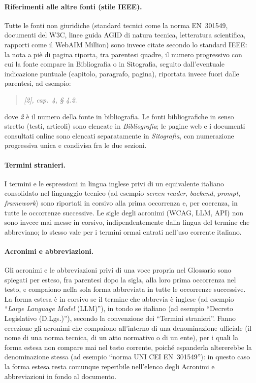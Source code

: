 \paragraph*{Riferimenti alle altre fonti (stile IEEE).} Tutte le fonti non giuridiche (standard tecnici come la norma EN~301549, documenti del W3C, linee guida AGID di natura tecnica, letteratura scientifica, rapporti come il WebAIM Million) sono invece citate secondo lo standard IEEE: la nota a piè di pagina riporta, tra parentesi quadre, il numero progressivo con cui la fonte compare in Bibliografia o in Sitografia, seguito dall'eventuale indicazione puntuale (capitolo, paragrafo, pagina), riportata invece fuori dalle parentesi, ad esempio:
\begin{quote}
\itshape [2], cap.~4, § 4.2.
\end{quote}
dove \emph{2} è il numero della fonte in bibliografia. Le fonti bibliografiche in senso stretto (testi, articoli) sono elencate in \emph{Bibliografia}; le pagine web e i documenti consultati online sono elencati separatamente in \emph{Sitografia}, con numerazione progressiva unica e condivisa fra le due sezioni.

\paragraph*{Termini stranieri.} I termini e le espressioni in lingua inglese privi di un equivalente italiano consolidato nel linguaggio tecnico (ad esempio \emph{screen reader}, \emph{backend}, \emph{prompt}, \emph{framework}) sono riportati in corsivo alla prima occorrenza e, per coerenza, in tutte le occorrenze successive. Le sigle degli acronimi (WCAG, LLM, API) non sono invece mai messe in corsivo, indipendentemente dalla lingua del termine che abbreviano; lo stesso vale per i termini ormai entrati nell'uso corrente italiano.

\paragraph*{Acronimi e abbreviazioni.} Gli acronimi e le abbreviazioni privi di una voce propria nel Glossario sono spiegati per esteso, fra parentesi dopo la sigla, alla loro prima occorrenza nel testo, e compaiono nella sola forma abbreviata in tutte le occorrenze successive. La forma estesa è in corsivo se il termine che abbrevia è inglese (ad esempio \enquote{\emph{Large Language Model} (LLM)}), in tondo se italiano (ad esempio \enquote{Decreto Legislativo (D.Lgs.)}), secondo la convenzione dei \enquote{Termini stranieri}. Fanno eccezione gli acronimi che compaiono all'interno di una denominazione ufficiale (il nome di una norma tecnica, di un atto normativo o di un ente), per i quali la forma estesa non compare mai nel testo corrente, poiché espanderla altererebbe la denominazione stessa (ad esempio \enquote{norma UNI CEI EN~301549}): in questo caso la forma estesa resta comunque reperibile nell'elenco degli Acronimi e abbreviazioni in fondo al documento.

